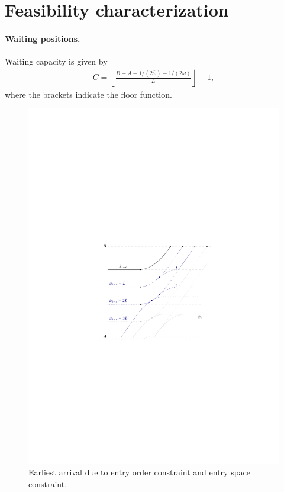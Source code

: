 \documentclass[a4paper]{report}
\theoremstyle{definition}
\theoremstyle{plain}
\begin{document}
\section{Feasibility characterization}

\paragraph{Waiting positions.}
Waiting capacity is given by
\begin{align}
  C = \left\lfloor \frac{B-A-1/(2\bar{\omega}) -1/(2\omega)}{L} \right\rfloor + 1 ,
\end{align}
where the brackets indicate the floor function.


\begin{figure}
  \centering
  \includegraphics[scale=1]{figures/motion/earliest-arrival}
 \caption{Earliest arrival due to entry order constraint and entry space constraint.}%
\end{figure}
\end{document}
